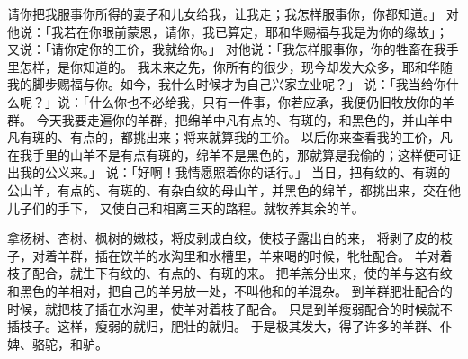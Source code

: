 {请你把我服事你所得的妻子和儿女给我，让我走；我怎样服事你，你都知道。」
对他说：「我若在你眼前蒙恩，请你{}，{}我已算定，耶和华赐福与我是为你的缘故」；
又说：「请你定你的工价，我就给你。」
对他说：「我怎样服事你，你的牲畜在我手里怎样，是你知道的。
我未来之先，你所有的很少，现今却发大众多，耶和华随我的脚步赐福与你。如今，我什么时候才为自己兴家立业呢？」
说：「我当给你什么呢？」{}说：「什么你也不必给我，只有一件事，你若应承，我便仍旧牧放你的羊群。
今天我要走遍你的羊群，把绵羊中凡有点的、有斑的，和黑色的，并山羊中凡有斑的、有点的，都挑出来；将来{}就算我的工价。
以后你来查看我的工价，凡在我手里的山羊不是有点有斑的，绵羊不是黑色的，那就算是我偷的；这样便可证出我的公义来。」
说：「好啊！我情愿照着你的话行。」
当日，{}把有纹的、有斑的公山羊，有点的、有斑的、有杂白纹的母山羊，并黑色的绵羊，都挑出来，交在他儿子们的手下，
又使自己和{}相离三天的路程。{}就牧养{}其余的羊。
\par }{\PP {}拿杨树、杏树、枫树的嫩枝，将皮剥成白纹，使枝子露出白的来，
将剥了皮的枝子，对着羊群，插在饮羊的水沟里和水槽里，羊来喝的时候，牝牡配合。
羊对着枝子配合，就生下有纹的、有点的、有斑的来。
把羊羔分出来，使{}的羊与这有纹和黑色的羊相对，把自己的羊另放一处，不叫他和{}的羊混杂。
到羊群肥壮配合的时候，{}就把枝子插在水沟里，使羊对着枝子配合。
只是到羊瘦弱配合的时候就不插枝子。这样，瘦弱的就归{}，肥壮的就归{}。
于是{}极其发大，得了许多的羊群、仆婢、骆驼，和驴。

}

